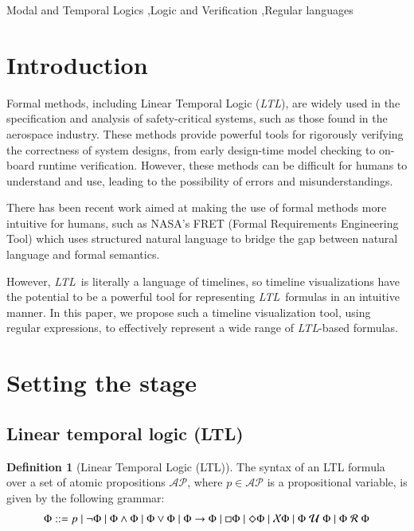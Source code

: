 \documentclass[preprint,12pt]{elsarticle}
\theoremstyle{definition}
\newtheorem{definition}{Definition}[section]
\theoremstyle{remark}
\newcommand{\AP}{\mathcal{AP}}
\newcommand{\always}{\Box}
\newcommand{\eventually}{\Diamond}
\newcommand{\nextt}{\mathcal{X}}
\newcommand{\limplies}{\rightarrow}
\newcommand{\ltl}{\textit{LTL}}
\newcommand{\stronguntil}{\hspace{0.1cm} \mathcal{U}  \hspace{0.1cm}}
\newcommand{\weakrelease}{\hspace{0.1cm} \mathcal{R} \hspace{0.1cm}}
\begin{document}
\begin{frontmatter}
    \begin{keyword}
        Modal and Temporal Logics
        \sep Logic and Verification
        \sep Regular languages
    \end{keyword}
\end{frontmatter}

\section{Introduction}

Formal methods, including Linear Temporal Logic (\ltl), are widely used in the specification and analysis of safety-critical systems, such as those found in the aerospace industry. These methods provide powerful tools for rigorously verifying the correctness of system designs, from early design-time model checking to on-board runtime verification. However, these methods can be difficult for humans to understand and use, leading to the possibility of errors and misunderstandings.

There has been recent work aimed at making the use of formal methods more intuitive for humans, such as NASA's FRET (Formal Requirements Engineering Tool) \cite{GPMS20} which uses structured natural language to bridge the gap between natural language and formal semantics.

However, \ltl\ is literally a language of timelines, so timeline visualizations have the potential to be a powerful tool for representing \ltl\ formulas in an intuitive manner. In this paper, we propose such a timeline visualization tool, using regular expressions, to effectively represent a wide range of \ltl-based formulas.

\section{Setting the stage}

\subsection{Linear temporal logic (LTL)}

\begin{definition}[Linear Temporal Logic (LTL)]
    The syntax of an LTL formula over a set of atomic propositions $\AP$, where $p\in\AP$ is a propositional variable, is given by the following grammar:
    \begin{align*}
        \Phi ::= p \mid \neg \Phi \mid \Phi \land \Phi \mid \Phi \lor \Phi \mid \Phi \limplies \Phi \mid \always \Phi \mid \eventually \Phi \mid \nextt \Phi \mid \Phi \stronguntil \Phi \mid \Phi \weakrelease \Phi
    \end{align*}\label{ltl-defn}
\end{definition}
\end{document}
